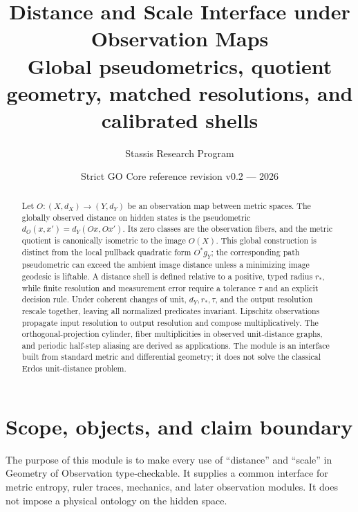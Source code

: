 \documentclass[11pt,a4paper]{article}
\title{\bfseries Distance and Scale Interface under Observation Maps\\
\large Global pseudometrics, quotient geometry, matched resolutions, and calibrated shells}
\author{Stassis Research Program}
\date{Strict GO Core reference revision v0.2 --- 2026}
\theoremstyle{definition}
\theoremstyle{plain}
\theoremstyle{remark}
\begin{document}
\maketitle

\begin{center}
\end{center}

\begin{abstract}
Let $O:(X,d_X)\to(Y,d_Y)$ be an observation map between metric spaces.
The globally observed distance on hidden states is the pseudometric
$d_O(x,x')=d_Y(Ox,Ox')$. Its zero classes are the observation fibers, and
the metric quotient is canonically isometric to the image $O(X)$. This
global construction is distinct from the local pullback quadratic form
$O^*g_Y$; the corresponding path pseudometric can exceed the ambient
image distance unless a minimizing image geodesic is liftable. A
distance shell is defined relative to a positive, typed radius $r_*$,
while finite resolution and measurement error require a tolerance
$\tau$ and an explicit decision rule. Under coherent changes of unit,
$d_Y,r_*,\tau$, and the output resolution rescale together, leaving all
normalized predicates invariant. Lipschitz observations propagate input
resolution to output resolution and compose multiplicatively. The
orthogonal-projection cylinder, fiber multiplicities in observed
unit-distance graphs, and periodic half-step aliasing are derived as
applications. The module is an interface built from standard metric and
differential geometry; it does not solve the classical Erdos unit-distance
problem.
\end{abstract}

\tableofcontents

\section{Scope, objects, and claim boundary}

The purpose of this module is to make every use of ``distance'' and
``scale'' in Geometry of Observation type-checkable. It supplies a common
interface for metric entropy, ruler traces, mechanics, and later
observation modules. It does not impose a physical ontology on the hidden
space.
\end{document}

